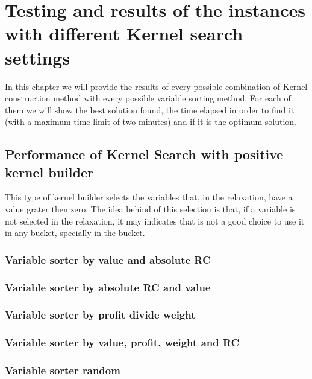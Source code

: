 \chapter{Testing and results of the instances with different Kernel search settings}
In this chapter we will provide the results of every possible combination of Kernel construction method with every possible variable sorting method.
For each of them we will show the best solution found, the time elapsed in order to find it (with a maximum time limit of two minutes) and if it is the optimum solution.
\section{Performance of Kernel Search with positive kernel builder}\label{Instances results}
This type of kernel builder selects the variables that, in the relaxation, have a value grater then zero.
The idea behind of this selection is that, if a variable is not selected in the relaxation, it may indicates that is not a good choice to use it in any bucket, specially in the bucket.

\newpage
\subsection{Variable sorter by value and absolute RC}


\newpage
\subsection{Variable sorter by absolute RC and value}


\newpage
\subsection{Variable sorter by profit divide weight}


\newpage
\subsection{Variable sorter by value, profit, weight and RC}


\newpage
\subsection{Variable sorter random}


